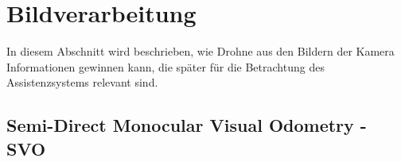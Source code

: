 \section{Bildverarbeitung}
\label{Bildverarbeitung}
In diesem Abschnitt wird beschrieben, wie Drohne aus den Bildern der Kamera Informationen gewinnen kann, die später für die Betrachtung des Assistenzsystems relevant sind. 

\subsection{Semi-Direct Monocular Visual Odometry - SVO}


